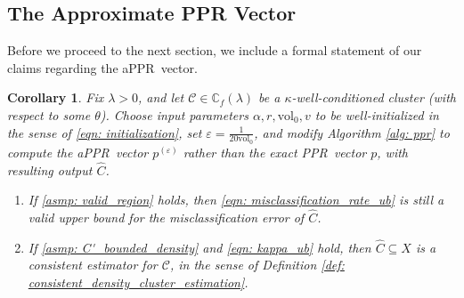 \documentclass[11pt,twoside]{article}
\newtheorem{corollary}{Corollary}
\newcommand{\vol}{\mathrm{vol}}
\newcommand{\1}{\mathbf{1}}
\newcommand{\pbf}{p}        %
\newcommand{\Xbf}{X}             %
\newcommand{\Cbb}{\mathbb{C}}
\newcommand{\Cset}{\mathcal{C}}
\newcommand{\Cest}{\widehat{C}}
\newcommand{\pprspace}{{\sc PPR~}}
\begin{document}
\subsection{The Approximate PPR Vector}
\label{sec:appr}
Before we proceed to the next section, we include a formal statement of our claims regarding the a\pprspace vector. 
\begin{corollary}
	\label{cor: appr}
	Fix $\lambda > 0$, and let $\Cset \in \Cbb_f(\lambda)$ be a $\kappa$-well-conditioned cluster (with respect to some $\theta$). Choose input parameters $\alpha, r, \vol_0, v$ to be well-initialized in the sense of \eqref{eqn: initialization}, set $\varepsilon = \frac{1}{20 \vol_0}$, and modify Algorithm \ref{alg: ppr} to compute the a\pprspace vector $\pbf^{(\varepsilon)}$ rather than the exact \pprspace vector $\pbf$, with resulting output $\Cest$.
	\begin{enumerate}
		\item If \ref{asmp: valid_region} holds, then \eqref{eqn: misclassification_rate_ub} is still a valid upper bound for the misclassification error of $\Cest$.
		\item If \ref{asmp: C'_bounded_density} and \eqref{eqn: kappa_ub} hold, 
		then $\Cest \subseteq \Xbf$ is a consistent estimator for $\Cset$, in the sense of Definition \ref{def: consistent_density_cluster_estimation}.
	\end{enumerate}
\end{corollary}
\end{document}
